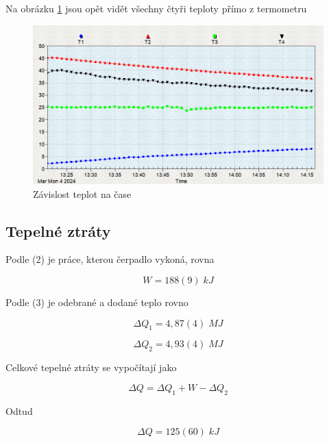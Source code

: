 Na obrázku \ref{fig:T(t)-vyp} jsou opět vidět všechny čtyři teploty přímo z termometru

\begin{figure}[h]
    \centering
    \includegraphics[width=0.8\linewidth]{27 - Tepelné čerpadlo//Protokol_tepelné čerpadlo//img/Vyp.png}
    \caption{Závislost teplot na čase}
    \label{fig:T(t)-vyp}
\end{figure}

\newpage

\subsection{Tepelné ztráty}

Podle (2) je práce, kterou čerpadlo vykoná, rovna

\begin{equation}
    \nonumber
    W = 188(9) \; kJ
\end{equation}

Podle (3) je odebrané a dodané teplo rovno

\begin{equation}
    \nonumber
    \Delta Q_1 = 4,87(4) \; MJ
\end{equation}

\begin{equation}
    \nonumber
    \Delta Q_2 = 4,93(4) \; MJ
\end{equation}

Celkové tepelné ztráty se vypočítají jako

\begin{equation}
    \nonumber
    \Delta Q = \Delta Q_1 + W - \Delta Q_2
\end{equation}

Odtud

\begin{equation}
    \nonumber
    \Delta Q = 125(60) \; kJ
\end{equation}

